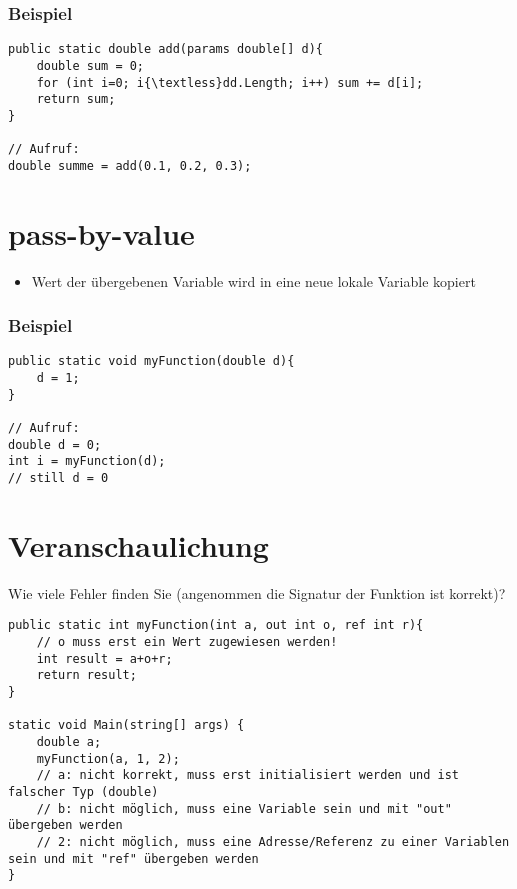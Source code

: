 \subsubsection*{Beispiel}
\begin{lstlisting}[language={[Sharp]C}]
public static double add(params double[] d){
	double sum = 0; 
	for (int i=0; i{\textless}dd.Length; i++) sum += d[i];
	return sum;
}

// Aufruf: 
double summe = add(0.1, 0.2, 0.3);
\end{lstlisting}
\section{pass-by-value}
\begin{itemize}
\item Wert der übergebenen Variable wird in eine neue lokale Variable kopiert
\end{itemize}
\subsubsection*{Beispiel}
\begin{lstlisting}[language={[Sharp]C}]
public static void myFunction(double d){
	d = 1;
}

// Aufruf: 
double d = 0;
int i = myFunction(d);
// still d = 0 
\end{lstlisting}

\section{Veranschaulichung}
Wie viele Fehler finden Sie (angenommen die Signatur der Funktion ist korrekt)?
\begin{lstlisting}[language={[Sharp]C}]
public static int myFunction(int a, out int o, ref int r){ 
	// o muss erst ein Wert zugewiesen werden!
	int result = a+o+r; 
	return result; 
} 

static void Main(string[] args) { 
	double a; 
	myFunction(a, 1, 2);
	// a: nicht korrekt, muss erst initialisiert werden und ist falscher Typ (double)
	// b: nicht möglich, muss eine Variable sein und mit "out" übergeben werden
	// 2: nicht möglich, muss eine Adresse/Referenz zu einer Variablen sein und mit "ref" übergeben werden
}
\end{lstlisting}
